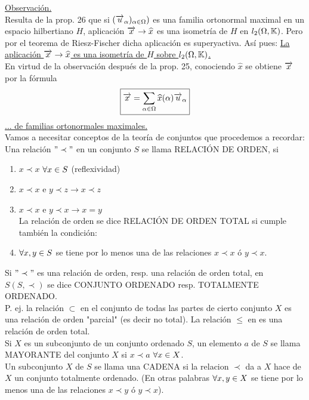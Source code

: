  \underline{Observación.}\\
 Resulta de la prop. 26 que si $(\overrightarrow{u}_\alpha)_{\alpha \in \Omega})$ es una familia ortonormal maximal en un espacio hilbertiano $H$, aplicación $\overrightarrow{x} \to \widehat{x}$ es una isometría de $H$ en $l_2(\Omega,\mathbb{K})$. Pero por el teorema de Riesz-Fischer dicha aplicación es superyactiva. Así pues:
\underline{La aplicación $\overrightarrow{x} \to \widehat{x}$ es una isometría de $H$ sobre $l_2(\Omega,\mathbb{K})$.} \\
En virtud de la observación después de la prop. 25, conociendo $\widehat{x}$ se obtiene $\overrightarrow{x}$ por la fórmula
\begin{equation*}
\boxed{\overrightarrow{x}=\sum_{\alpha \in \Omega} \widehat{x}(\alpha) \overrightarrow{u}_\alpha}
\end{equation*}
\underline{... de familias ortonormales maximales.}\\
Vamos a necesitar conceptos de la teoría de conjuntos que procedemos a recordar: \\
Una relación $"\prec"$ en un conjunto $S$ se llama RELACIÓN DE ORDEN, si  
\begin{enumerate}[1)]
\item $x\prec x$ $\forall x \in S$ (reflexividad)
\item $x\prec x$ e $y\prec z \to x\prec z$
\item $x\prec x$ e $y\prec x \to x =y$ \\
La relación  de orden se dice RELACIÓN DE ORDEN TOTAL si cumple también la condición: 
\item $\forall x,y \in S$ se tiene por lo menos una de las relaciones  $x\prec x$ ó $y\prec x$.

\end{enumerate}
Si $" \prec "$ es una relación de orden, resp. una relación de orden total, en $S (S, \prec)$ se dice CONJUNTO ORDENADO resp. TOTALMENTE ORDENADO. \\
P. ej. la relación $\subset$ en el conjunto de todas las partes de cierto conjunto $X$ es una relación de orden "parcial" (es decir no total). La relación $\leq$ en \R \phantom{s} es una relación de orden total. \\
Si $X$ es un subconjunto de un conjunto ordenado $S$, un elemento $a$ de $S$ se llama MAYORANTE del conjunto $X$ si $x \prec a$ $\forall x \in X$. \\
Un subconjunto $X$ de $S$ se llama una CADENA si la relacion $\prec$ da a $X$ hace de $X$ un conjunto totalmente ordenado. (En otras palabras $\forall x, y \in X$ se tiene por lo menos una de las relaciones $x \prec y$ ó $y \prec x$). \\
